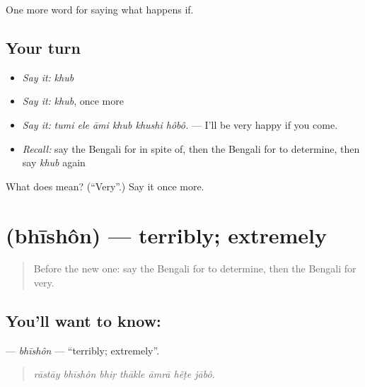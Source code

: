 \begin{grammarlens}[title={What you've built}]
One more word for saying what happens if.
\end{grammarlens}

\subsection*{Your turn}
\begin{itemize}
\raggedright
  \item \emph{Say it:} \emph{khub}
  \item \emph{Say it:} \emph{khub}, once more
  \item \emph{Say it:} \emph{tumi ele āmi khub khushi hôbô.} — I'll be very happy if you come.
  \item \emph{Recall:} say the Bengali for in spite of, then the Bengali for to determine, then say \emph{khub} again
\end{itemize}

\begin{tcolorbox}[breakable,colback=teal!4,colframe=teal!35!black,title={Before you move on}]
What does  mean? (\textquotedblleft{}Very\textquotedblright{}.) Say it once more.
\end{tcolorbox}
\section[\texorpdfstring{\bn{ভীষণ} (bhīshôn)}{ভীষণ (bhīshôn)}]{ (bhīshôn) — terribly; extremely}

\label{lesson:BN-C370-bhishon}



\begin{quote}
Before the new one: say the Bengali for to determine, then the Bengali for very.
\end{quote}

\subsection*{You'll want to know: }
\textbf{} — \emph{bhīshôn} — \textquotedblleft{}terribly; extremely\textquotedblright{}.

\begin{quote}
      
\end{quote}

\begin{quote}
\emph{rāstāy bhīshôn bhiṛ thākle āmrā hẽṭe jābô.}
\end{quote}

